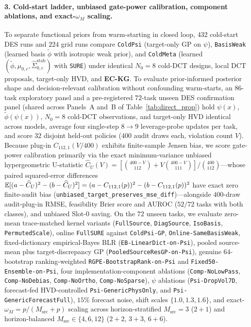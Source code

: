 \paragraph{3. Cold-start ladder, unbiased gate-power calibration, component ablations, and exact-$\omega_M$ scaling.}
To separate functional priors from warm-starting in closed loop, $432$ cold-start DES runs and $224$ grid runs compare \texttt{ColdPsi} (target-only GP on $\psi$), \texttt{BasisWeak} (learned basis $\tilde{\phi}$ with isotropic weak prior), and \texttt{ColdMeta} (learned $(\tilde{\phi}, \mu_{0,c}, \widehat{\Sigma}_{0,c}^{\mathrm{stab}})$ with \texttt{SURE}) under identical $N_0=8$ cold-DCT designs, local DCT proposals, target-only HVD, and \textbf{EC-KG}. To evaluate prior-informed posterior shape and decision-relevant calibration without confounding warm-starts, an $86$-task exploratory panel and a pre-registered $72$-task unseen DES confirmation panel (shared across Panels~A and~B of Table~\ref{tab:direct_prop}) hold $\psi(x)$, $\tilde{\phi}(\psi(x))$, $N_0=8$ cold-DCT observations, and target-only HVD identical across models, average four single-step $8 \to 9$ leverage-probe updates per task, and score $32$ disjoint held-out policies ($400$ audit draws each, violation count $V$). Because plug-in $C_{112,1}(V/400)$ exhibits finite-sample Jensen bias, we score gate-power calibration primarily via the exact minimum-variance unbiased hypergeometric U-statistic $\widehat{C}_U(V) = [\binom{400-V}{112} + V\binom{400-V}{111}]/\binom{400}{112}$—whose paired squared-error differences $\mathbb{E}[(a - \widehat{C}_U)^2 - (b - \widehat{C}_U)^2] = (a - C_{112,1}(p))^2 - (b - C_{112,1}(p))^2$ have exact zero finite-audit bias (\texttt{unbiased\_target\_preserves\_mse\_diff})—alongside $400$-draw audit-plug-in RMSE, feasibility Brier score and AUROC ($52/72$ tasks with both classes), and unbiased Slot-0 saving. On the $72$ unseen tasks, we evaluate zero-mean trace-matched kernel variants (\texttt{FullSource}, \texttt{DiagSource}, \texttt{IsoBasis}, \texttt{PermutedScale}), online \texttt{FullSURE} against \texttt{ColdPsi-GP}, \texttt{Online-SameBasisWeak}, fixed-dictionary empirical-Bayes BLR (\texttt{EB-LinearDict-on-Psi}), pooled source-mean plus target-discrepancy GP (\texttt{PooledSourceResGP-on-Psi}), genuine $64$-bootstrap ranking-weighted \texttt{RGPE-BootstrapRank-on-Psi} \citep{feurer2018scalable} and \texttt{Fixed50-Ensemble-on-Psi}, four implementation-component ablations (\texttt{Comp-NoLowPass}, \texttt{Comp-NoDebias}, \texttt{Comp-NoOrtho}, \texttt{Comp-NoSparse}), $\psi$ ablations (\texttt{Psi-DropVol7D}, forecast-fed HVD-controlled \texttt{Psi-GenericPhysOnly}, and \texttt{Psi-GenericForecastFull}), $15\%$ forecast noise, shift scales $\{1.0, 1.3, 1.6\}$, and exact-$\omega_M = p/(M_{\mathrm{src}}+p)$ scaling across horizon-stratified $M_{\mathrm{src}}=3$ ($2+1$) and horizon-balanced $M_{\mathrm{src}} \in \{4, 6, 12\}$ ($2+2$, $3+3$, $6+6$).
